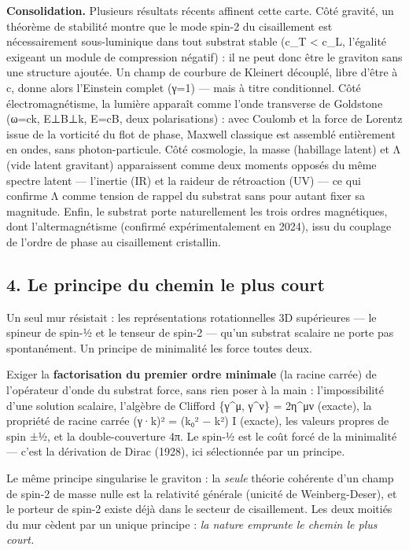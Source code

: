 \documentclass[11pt]{article}
\begin{document}
\textbf{Consolidation.} Plusieurs résultats récents affinent cette
carte. Côté gravité, un théorème de stabilité montre que le mode spin-2
du cisaillement est nécessairement sous-luminique dans tout substrat
stable (c\_T \textless{} c\_L, l'égalité exigeant un module de
compression négatif) : il ne peut donc être le graviton sans une
structure ajoutée. Un champ de courbure de Kleinert découplé, libre
d'être à c, donne alors l'Einstein complet (γ=1) --- mais à titre
conditionnel. Côté électromagnétisme, la lumière apparaît comme l'onde
transverse de Goldstone (ω=ck, E⊥B⊥k,
\textbar E\textbar=c\textbar B\textbar, deux polarisations) : avec
Coulomb et la force de Lorentz issue de la vorticité du flot de phase,
Maxwell classique est assemblé entièrement en ondes, sans
photon-particule. Côté cosmologie, la masse (habillage latent) et Λ
(vide latent gravitant) apparaissent comme deux moments opposés du même
spectre latent --- l'inertie (IR) et la raideur de rétroaction (UV) ---
ce qui confirme Λ comme tension de rappel du substrat sans pour autant
fixer sa magnitude. Enfin, le substrat porte naturellement les trois
ordres magnétiques, dont l'altermagnétisme (confirmé expérimentalement
en 2024), issu du couplage de l'ordre de phase au cisaillement
cristallin.

\hypertarget{le-principe-du-chemin-le-plus-court}{%
\subsection{4. Le principe du chemin le plus
court}\label{le-principe-du-chemin-le-plus-court}}

Un seul mur résistait : les représentations rotationnelles 3D
supérieures --- le spineur de spin-½ et le tenseur de spin-2 --- qu'un
substrat scalaire ne porte pas spontanément. Un principe de minimalité
les force toutes deux.

Exiger la \textbf{factorisation du premier ordre minimale} (la racine
carrée) de l'opérateur d'onde du substrat force, sans rien poser à la
main : l'impossibilité d'une solution scalaire, l'algèbre de Clifford
\{γ\^{}μ, γ\^{}ν\} = 2η\^{}μν (exacte), la propriété de racine carrée
(γ·k)² = (k₀² − \textbar k\textbar²) I (exacte), les valeurs propres de
spin ±½, et la double-couverture 4π. Le spin-½ est le coût forcé de la
minimalité --- c'est la dérivation de Dirac (1928), ici sélectionnée par
un principe.

Le même principe singularise le graviton : la \emph{seule} théorie
cohérente d'un champ de spin-2 de masse nulle est la relativité générale
(unicité de Weinberg-Deser), et le porteur de spin-2 existe déjà dans le
secteur de cisaillement. Les deux moitiés du mur cèdent par un unique
principe : \emph{la nature emprunte le chemin le plus court.}
\end{document}
